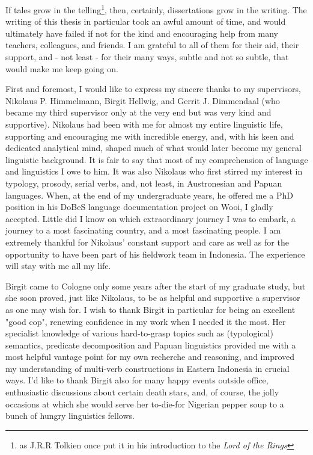 \begin{refsection}

If tales grow in the telling\footnote{as J.R.R Tolkien once put it in his introduction to the \textit{Lord of the Rings}}, then, certainly, dissertations grow in the writing. The writing of this thesis in particular took an awful amount of time, and would ultimately have failed if not for the kind and encouraging help from many teachers, colleagues, and friends. I am grateful to all of them for their aid, their support, and - not least - for their many ways, subtle and not so subtle, that would make me keep going on.

First and foremost, I would like to express my sincere thanks to my supervisors, Nikolaus P. Himmelmann, Birgit Hellwig, and Gerrit J. Dimmendaal (who became my third supervisor only at the very end but was very kind and supportive). Nikolaus had been with me for almost my entire linguistic life, supporting and encouraging me with incredible energy, and, with his keen and dedicated analytical mind, shaped much of what would later become my general linguistic background. It is fair to say that most of my comprehension of language and linguistics I owe to him. It was also Nikolaus who first stirred my interest in typology, prosody, serial verbs, and, not least, in Austronesian and Papuan languages. When, at the end of my undergraduate years, he offered me a PhD position in his DoBeS language documentation project on Wooi, I gladly accepted. Little did I know on which extraordinary journey I was to embark, a journey to a most fascinating country, and a most fascinating people. I am extremely thankful for Nikolaus' constant support and care as well as for the opportunity to have been part of his fieldwork team in Indonesia. The experience will stay with me all my life.

Birgit came to Cologne only some years after the start of my graduate study, but she soon proved, just like Nikolaus, to be as helpful and supportive a supervisor as one may wish for. I wish to thank Birgit in particular for being an excellent "good cop", renewing confidence in my work when I needed it the most. Her specialist knowledge of various hard-to-grasp topics such as (typological) semantics, predicate decomposition and Papuan linguistics provided me with a most helpful vantage point for my own recherche and reasoning, and improved my understanding of multi-verb constructions in Eastern Indonesia in crucial ways. I'd like to thank Birgit also for many happy events outside office, enthusiastic discussions about certain death stars, and, of course, the jolly occasions at which she would serve her to-die-for Nigerian pepper soup to a bunch of hungry linguistics fellows.


\end{refsection}
